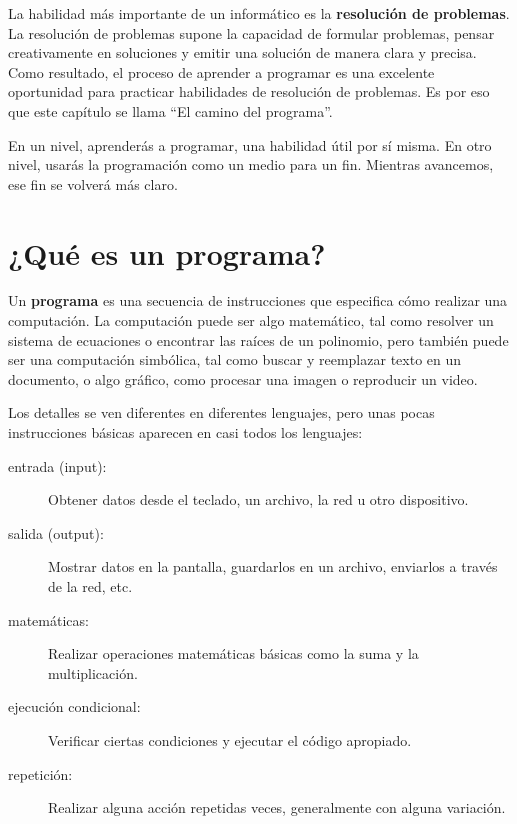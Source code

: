 \documentclass[10pt]{book}
\begin{document}
La habilidad más importante de un informático es la {\bf resolución
 de problemas}.  La resolución de problemas supone la capacidad de
 formular problemas, pensar creativamente en soluciones y emitir una solución
de manera clara y precisa.  Como resultado, el proceso de aprender a
programar es una excelente oportunidad para practicar habilidades de
resolución de problemas.  Es por eso que este capítulo se llama ``El camino del
programa''.

En un nivel, aprenderás a programar, una habilidad útil por
sí misma.  En otro nivel, usarás la programación como un medio para un
fin.  Mientras avancemos, ese fin se volverá más claro.


\section{¿Qué es un programa?}

Un {\bf programa} es una secuencia de instrucciones que especifica cómo
realizar una computación.  La computación puede ser algo matemático,
tal como resolver un sistema de ecuaciones o encontrar las raíces de un
polinomio, pero también puede ser una computación simbólica, tal como
buscar y reemplazar texto en un documento, o algo gráfico, como procesar
una imagen o reproducir un video.

Los detalles se ven diferentes en diferentes lenguajes, pero unas pocas
instrucciones básicas aparecen en casi todos los lenguajes:

\begin{description}

\item[entrada ({input}):] Obtener datos desde el teclado, un archivo, la red u
otro dispositivo.

\item[salida ({output}):] Mostrar datos en la pantalla, guardarlos en un
archivo, enviarlos a través de la red, etc.

\item[matemáticas:] Realizar operaciones matemáticas básicas como la suma y
la multiplicación.

\item[ejecución condicional:] Verificar ciertas condiciones y
ejecutar el código apropiado.

\item[repetición:] Realizar alguna acción repetidas veces, generalmente con
alguna variación.

\end{description}
\end{document}
